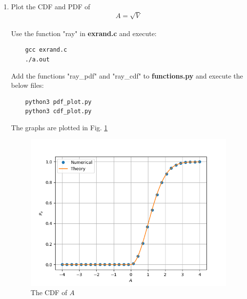 \documentclass[journal,12pt,twocolumn]{IEEEtran}
\renewcommand\thesection{\arabic{section}}
\begin{document}
\begin{enumerate}[label=\thesection.\arabic*
,ref=\thesection.\theenumi]
Comparing with Eq. \ref{eq:qn_Fv} we get:

\begin{align}
    \alpha = \frac{1}{2}
\end{align}


\item
\label{ch3_raleigh_sim}
Plot the CDF and PDF of
%
\begin{equation}
A = \sqrt{V}
\end{equation}
%
\\
\solution
Use the function "ray" in \textbf{exrand.c} and execute:
\begin{lstlisting}
    gcc exrand.c
    ./a.out
\end{lstlisting}

Add the functions "ray\_pdf" and "ray\_cdf" to \textbf{functions.py} and execute 
the below files:
\begin{lstlisting}
    python3 pdf_plot.py
    python3 cdf_plot.py
\end{lstlisting}

The graphs are plotted in Fig. \ref{fig:ray_cdf}


\begin{figure}
    \centering
    \includegraphics[width=\columnwidth]{./figures/CDF_ray.png}
    \caption{The CDF of $A$}
    \label{fig:ray_cdf}
    \end{figure}


\end{enumerate}
\end{document}
